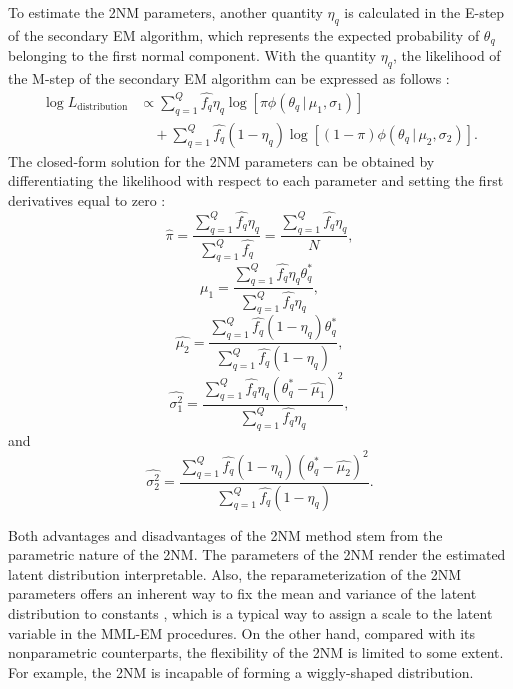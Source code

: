 To estimate the 2NM parameters, another quantity
\(\eta_q\) is calculated in the E-step of the secondary EM algorithm,
which represents the expected probability of \(\theta_q\) belonging to the
first normal component. With the quantity \(\eta_q\), the likelihood of the M-step
of the secondary EM algorithm can be expressed as follows \citep{Li:2021}:
\begin{equation}
\begin{split}
\log{L_{\text{distribution}}} &\propto
\sum_{q = 1}^{Q}{ \hat{f_q} \eta_q \log{\left[ \pi \phi{(\theta_q \, | \, \mu_1, \sigma_1)} \right]} } 
\\ &\quad + \sum_{q = 1}^{Q}{ \hat{f_q} (1 - \eta_q) \log{\left[ (1 - \pi) \phi{(\theta_q \, | \, \mu_2, \sigma_2)} \right]} }.
\end{split}
\label{eq:2nmlikeli}
\end{equation}
The closed-form solution for the 2NM parameters can be obtained by
differentiating the likelihood with respect to each parameter and
setting the first derivatives equal to zero \citep{Li:2021}:
\begin{equation}
\hat{\pi} = \frac{\sum_{q = 1}^{Q}{ \hat{f_q} \eta_{q}}}{\sum_{q = 1}^{Q}{ \hat{f_q}}} =
\frac{\sum_{q = 1}^{Q}{ \hat{f_q} \eta_{q}} }{N},
\label{eq:pi}
\end{equation}
\begin{equation}
\hat{\mu_{1}} = \frac{\sum_{q = 1}^{Q}{ \hat{f_q} \eta_{q} \theta_{q}^{*}}}
{\sum_{q = 1}^{Q}{ \hat{f_q} \eta_{q}}},
\label{eq:mu1}
\end{equation}
\begin{equation}
\hat{\mu_{2}} = \frac{\sum_{q = 1}^{Q}{ \hat{f_q} (1- \eta_{q}) \theta_{q}^{*}}}
{\sum_{q = 1}^{Q}{ \hat{f_q} (1- \eta_{q})}},
\label{eq:mu2}
\end{equation}
\begin{equation}
\hat{\sigma_{1}^{2}} = \frac{\sum_{q = 1}^{Q}{ \hat{f_q} \eta_{q} \left( \theta_{q}^{*} - \hat{\mu_{1}} \right)^{2} }}
{\sum_{q = 1}^{Q}{ \hat{f_q} \eta_{q}}},
\label{eq:sigma1}
\end{equation}
and
\begin{equation}
\hat{\sigma_{2}^{2}} = \frac{\sum_{q = 1}^{Q}{ \hat{f_q} (1- \eta_{q}) \left( \theta_{q}^{*} - \hat{\mu_{2}} \right)^{2} }}
{\sum_{q = 1}^{Q}{ \hat{f_q} (1- \eta_{q})}}.
\label{eq:sigma2}
\end{equation}

Both advantages and disadvantages of the 2NM method stem from the
parametric nature of the 2NM. The parameters of the 2NM render the
estimated latent distribution interpretable. Also, the
reparameterization of the 2NM parameters offers an inherent way to fix the
mean and variance of the latent distribution to constants \citep[see][]{Li:2021}, which is a typical way to assign a scale to the latent
variable in the MML-EM procedures. On the other hand, compared with its
nonparametric counterparts, the flexibility of the 2NM is limited to some
extent. For example, the 2NM is incapable of forming a wiggly-shaped
distribution.

